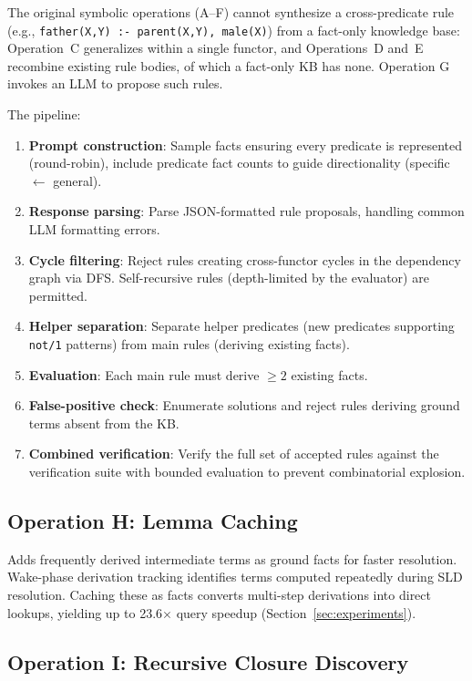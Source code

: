 \documentclass[10pt,conference]{IEEEtran}
\begin{document}
The original symbolic operations (A--F) cannot synthesize a cross-predicate rule (e.g., \texttt{father(X,Y) :- parent(X,Y), male(X)}) from a fact-only knowledge base: Operation~C generalizes within a single functor, and Operations~D and~E recombine existing rule bodies, of which a fact-only KB has none. Operation G invokes an LLM to propose such rules.

The pipeline:
\begin{enumerate}
\item \textbf{Prompt construction}: Sample facts ensuring every predicate is represented (round-robin), include predicate fact counts to guide directionality (specific $\leftarrow$ general).
\item \textbf{Response parsing}: Parse JSON-formatted rule proposals, handling common LLM formatting errors.
\item \textbf{Cycle filtering}: Reject rules creating cross-functor cycles in the dependency graph via DFS. Self-recursive rules (depth-limited by the evaluator) are permitted.
\item \textbf{Helper separation}: Separate helper predicates (new predicates supporting \texttt{not/1} patterns) from main rules (deriving existing facts).
\item \textbf{Evaluation}: Each main rule must derive $\geq 2$ existing facts.
\item \textbf{False-positive check}: Enumerate solutions and reject rules deriving ground terms absent from the KB.
\item \textbf{Combined verification}: Verify the full set of accepted rules against the verification suite with bounded evaluation to prevent combinatorial explosion.
\end{enumerate}

\subsection{Operation H: Lemma Caching}

Adds frequently derived intermediate terms as ground facts for faster resolution. Wake-phase derivation tracking identifies terms computed repeatedly during SLD resolution. Caching these as facts converts multi-step derivations into direct lookups, yielding up to 23.6$\times$ query speedup (Section~\ref{sec:experiments}).

\subsection{Operation I: Recursive Closure Discovery}
\label{sec:opI}
\end{document}
